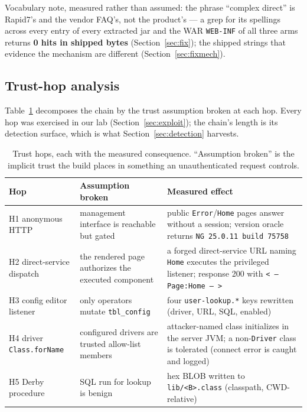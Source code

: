 \documentclass[journal]{IEEEtran}
\begin{document}
Vocabulary note, measured rather than assumed: the phrase ``complex direct''
is Rapid7's and the vendor FAQ's, not the product's — a grep for its
spellings across every entry of every extracted jar and the WAR
\texttt{WEB-INF} of all three arms returns \textbf{0 hits in shipped bytes}
(Section~\ref{sec:fix}); the shipped strings that evidence the mechanism are
different (Section~\ref{sec:fixmech}).

\subsection{Trust-hop analysis}
Table~\ref{tab:hops} decomposes the chain by the trust assumption broken at
each hop. Every hop was exercised in our lab (Section~\ref{sec:exploit}); the
chain's length is its detection surface, which is what Section~\ref{sec:detection}
harvests.

\begin{table}[t]
\centering
\caption{Trust hops, each with the measured consequence. ``Assumption broken''
is the implicit trust the build places in something an unauthenticated request
controls.}
\label{tab:hops}
\footnotesize
\begin{tabular}{p{}p{}p{}}
\toprule
Hop & Assumption broken & Measured effect \\
\midrule
H1 anonymous HTTP & management interface is reachable but gated & public
\texttt{Error}/\texttt{Home} pages answer without a session; version oracle
returns \texttt{NG 25.0.11 build 75758} \\
H2 direct-service dispatch & the rendered page authorizes the executed
component & a forged direct-service URL naming \texttt{Home} executes the
privileged listener; response 200 with \texttt{<\,-- Page:\allowbreak Home --\,>} \\
H3 config editor listener & only operators mutate \texttt{tbl\_config} & four
\texttt{user-lookup.*} keys rewritten (driver, URL, SQL, enabled) \\
H4 driver \texttt{Class.\allowbreak forName} & configured drivers are trusted
allow-list members & attacker-named class initializes in the server JVM; a
non-\texttt{Driver} class is tolerated (connect error is caught and logged) \\
H5 Derby procedure & SQL run for lookup is benign & hex BLOB written to
\texttt{lib/<B>.class} (classpath, CWD-relative) \\
\bottomrule
\end{tabular}
\end{table}
\end{document}
